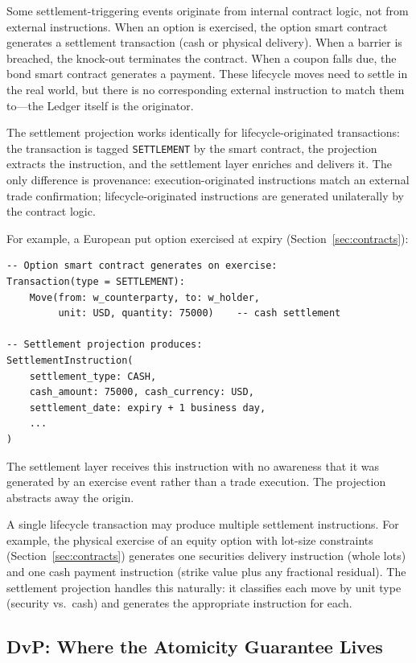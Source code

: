 \documentclass[11pt,a4paper]{article}
\begin{document}
Some settlement-triggering events originate from internal contract logic, not from external instructions. When an option is exercised, the option smart contract generates a settlement transaction (cash or physical delivery). When a barrier is breached, the knock-out terminates the contract. When a coupon falls due, the bond smart contract generates a payment. These lifecycle moves need to settle in the real world, but there is no corresponding external instruction to match them to---the Ledger itself is the originator.

The settlement projection works identically for lifecycle-originated transactions: the transaction is tagged \texttt{SETTLEMENT} by the smart contract, the projection extracts the instruction, and the settlement layer enriches and delivers it. The only difference is provenance: execution-originated instructions match an external trade confirmation; lifecycle-originated instructions are generated unilaterally by the contract logic.

For example, a European put option exercised at expiry (Section~\ref{sec:contracts}):

\begin{lstlisting}
-- Option smart contract generates on exercise:
Transaction(type = SETTLEMENT):
    Move(from: w_counterparty, to: w_holder,
         unit: USD, quantity: 75000)    -- cash settlement

-- Settlement projection produces:
SettlementInstruction(
    settlement_type: CASH,
    cash_amount: 75000, cash_currency: USD,
    settlement_date: expiry + 1 business day,
    ...
)
\end{lstlisting}

\noindent The settlement layer receives this instruction with no awareness that it was generated by an exercise event rather than a trade execution. The projection abstracts away the origin.

A single lifecycle transaction may produce multiple settlement instructions. For example, the physical exercise of an equity option with lot-size constraints (Section~\ref{sec:contracts}) generates one securities delivery instruction (whole lots) and one cash payment instruction (strike value plus any fractional residual). The settlement projection handles this naturally: it classifies each move by unit type (security vs.\ cash) and generates the appropriate instruction for each.

\subsection{DvP: Where the Atomicity Guarantee Lives}
\label{sec:settlement-dvp}
\end{document}
